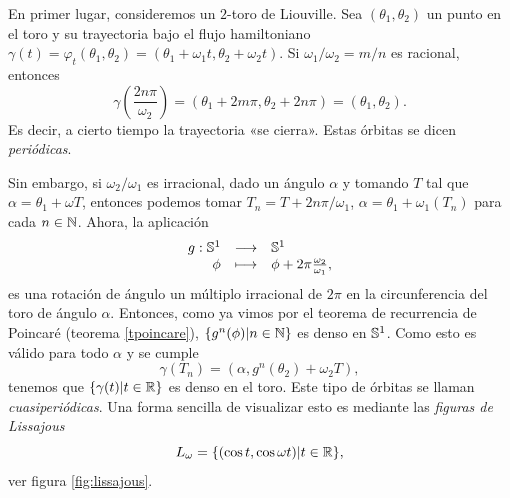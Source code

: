   En primer lugar, consideremos un $2$-toro de Liouville. Sea $(\theta_1,\theta_2)$ un punto en el toro y su trayectoria bajo el flujo hamiltoniano $\gamma(t)=\varphi_t(\theta_1,\theta_2)=(\theta_1+\omega_1t,\theta_2+\omega_2t)$. Si $\omega_1/\omega_2=m/n$ es racional, entonces 
  \begin{equation*}
    \gamma\left(\frac{2n\pi}{\omega_2}\right) = (\theta_1+2m\pi,\theta_2+2n\pi)=(\theta_1,\theta_2).
  \end{equation*}
  Es decir, a cierto tiempo la trayectoria «se cierra». Estas órbitas se dicen \emph{periódicas}. 
 
  Sin embargo, si $\omega_2/\omega_1$ es irracional, dado un ángulo $\alpha$ y tomando $T$ tal que $\alpha=\theta_1+\omega T$, entonces podemos tomar $T_n=T+2n\pi/\omega_1$, $\alpha=\theta_1+\omega_1(T_n)$ para cada $n\in \mathbb{N}$. Ahora, la aplicación
  \begin{equation*}
    \begin{array}{rcl}
    g:\mathbb{S}^1 & \longrightarrow &\mathbb{S}^1 \\
  \phi & \longmapsto & \phi + 2\pi\frac{\omega_2}{\omega_1},
  \end{array}
\end{equation*}
es una rotación de ángulo un múltiplo irracional de $2\pi$ en la circunferencia del toro de ángulo $\alpha$. Entonces, como ya vimos por el teorema de recurrencia de Poincaré (teorema \ref{tpoincare}), $\{g^n(\phi)|n\in \mathbb{N}\}$ es denso en $\mathbb{S}^1$. Como esto es válido para todo $\alpha$ y se cumple 
\begin{equation*}
  \gamma(T_n)=(\alpha,g^n(\theta_2)+\omega_2 T),
\end{equation*}
tenemos que $\{\gamma(t)|t \in \mathbb{R} \}$ es denso en el toro. Este tipo de órbitas se llaman \emph{cuasiperiódicas}. Una forma sencilla de visualizar esto es mediante las \emph{figuras de Lissajous} 
\begin{equation*}
  L_{\omega}=\{(\cos t, \cos \omega t) | t \in \mathbb{R}\},
\end{equation*}
ver figura \ref{fig:lissajous}.
